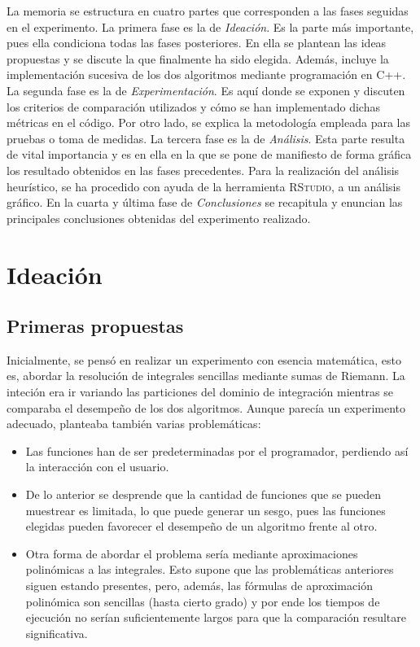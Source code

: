 \documentclass[12pt,a4paper]{article}
\begin{document}
\vspace{0.2cm}

La memoria se estructura en cuatro partes que corresponden a las fases seguidas en el experimento.
La primera fase es la de \textit{Ideación}. Es la parte más importante, pues ella condiciona todas las fases posteriores. En ella se plantean las ideas propuestas y se discute la que finalmente ha sido elegida. Además, incluye la implementación sucesiva de los dos algoritmos mediante programación en C++.
La segunda fase es la de \textit{Experimentación}. Es aquí donde se exponen y discuten los criterios de comparación utilizados y cómo se han implementado dichas métricas en el código. Por otro lado, se explica la metodología empleada para las pruebas o toma de medidas.
La tercera fase es la de \textit{Análisis}. Esta parte resulta de vital importancia y es en ella en la que se pone de manifiesto de forma gráfica los resultado obtenidos en las fases precedentes. Para la realización del análisis heurístico, se ha procedido con ayuda de la herramienta \textsc{RStudio}, a un análisis gráfico.
En la cuarta y última fase de \textit{Conclusiones} se recapitula y enuncian las principales conclusiones obtenidas del experimento realizado.

\clearpage
\section{Ideación}
\subsection{Primeras propuestas}

Inicialmente, se pensó en realizar un experimento con esencia matemática, esto es, abordar la resolución de integrales sencillas mediante sumas de Riemann. La inteción era ir variando las particiones del dominio de integración mientras se comparaba el desempeño de los dos algoritmos. Aunque parecía un experimento adecuado, planteaba también varias problemáticas: 

\begin{itemize}
	\item Las funciones han de ser predeterminadas por el programador, perdiendo así la interacción con el usuario.
	\item De lo anterior se desprende que la cantidad de funciones que se pueden muestrear es limitada, lo que puede generar un sesgo, pues las funciones elegidas pueden favorecer el desempeño de un algoritmo frente al otro. 
	\item Otra forma de abordar el problema sería mediante aproximaciones polinómicas a las integrales. Esto supone que las problemáticas anteriores siguen estando presentes, pero, además, las fórmulas de aproximación polinómica son sencillas (hasta cierto grado) y por ende los tiempos de ejecución no serían suficientemente largos para que la comparación resultare significativa. 
\end{itemize}
\end{document}
